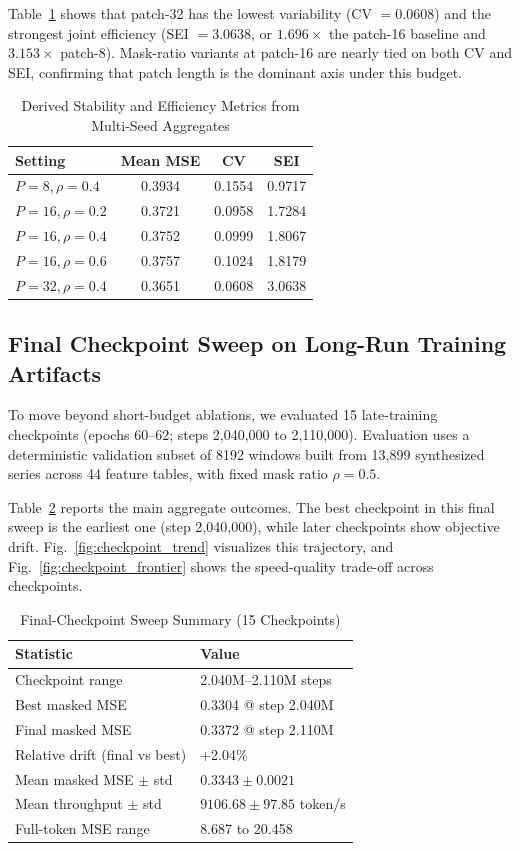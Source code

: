 \documentclass[journal]{IEEEtran}
\begin{document}
Table~\ref{tab:frontier_metrics} shows that patch-32 has the lowest variability (CV $=0.0608$) and the strongest joint efficiency (SEI $=3.0638$, or $1.696\times$ the patch-16 baseline and $3.153\times$ patch-8). Mask-ratio variants at patch-16 are nearly tied on both CV and SEI, confirming that patch length is the dominant axis under this budget.

\begin{table}[t]
\caption{Derived Stability and Efficiency Metrics from Multi-Seed Aggregates}
\label{tab:frontier_metrics}
\centering
\begin{tabular}{lccc}
\toprule
Setting & Mean MSE & CV & SEI \\
\midrule
$P=8,\rho=0.4$  & 0.3934 & 0.1554 & 0.9717 \\
$P=16,\rho=0.2$ & 0.3721 & 0.0958 & 1.7284 \\
$P=16,\rho=0.4$ & 0.3752 & 0.0999 & 1.8067 \\
$P=16,\rho=0.6$ & 0.3757 & 0.1024 & 1.8179 \\
$P=32,\rho=0.4$ & 0.3651 & 0.0608 & 3.0638 \\
\bottomrule
\end{tabular}
\end{table}

\subsection{Final Checkpoint Sweep on Long-Run Training Artifacts}
To move beyond short-budget ablations, we evaluated 15 late-training checkpoints (epochs 60--62; steps 2,040,000 to 2,110,000). Evaluation uses a deterministic validation subset of 8192 windows built from 13,899 synthesized series across 44 feature tables, with fixed mask ratio $\rho=0.5$.

Table~\ref{tab:checkpoint_sweep_summary} reports the main aggregate outcomes. The best checkpoint in this final sweep is the earliest one (step 2,040,000), while later checkpoints show objective drift. Fig.~\ref{fig:checkpoint_trend} visualizes this trajectory, and Fig.~\ref{fig:checkpoint_frontier} shows the speed-quality trade-off across checkpoints.

\begin{table}[t]
\caption{Final-Checkpoint Sweep Summary (15 Checkpoints)}
\label{tab:checkpoint_sweep_summary}
\centering
\begin{tabular}{ll}
\toprule
Statistic & Value \\
\midrule
Checkpoint range & 2.040M--2.110M steps \\
Best masked MSE & 0.3304 @ step 2.040M \\
Final masked MSE & 0.3372 @ step 2.110M \\
Relative drift (final vs best) & +2.04\% \\
Mean masked MSE $\pm$ std & $0.3343 \pm 0.0021$ \\
Mean throughput $\pm$ std & $9106.68 \pm 97.85$ token/s \\
Full-token MSE range & 8.687 to 20.458 \\
\bottomrule
\end{tabular}
\end{table}
\end{document}
